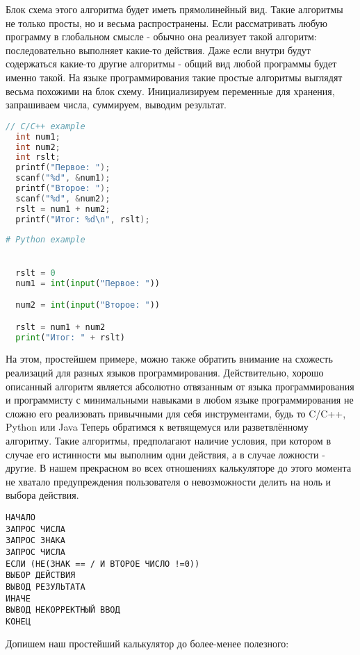 \documentclass[fontsize=14bp]{report}
\begin{document}
Блок схема этого алгоритма будет иметь прямолинейный вид. Такие алгоритмы не только просты, но и весьма распространены. Если рассматривать любую программу в глобальном смысле - обычно она реализует такой алгоритм: последовательно выполняет какие-то действия. Даже если внутри будут содержаться какие-то другие алгоритмы - общий вид любой программы будет именно такой.
На языке программирования такие простые алгоритмы выглядят весьма похожими на блок схему. Инициализируем переменные для хранения, запрашиваем числа, суммируем, выводим результат.
\begin{multicols}{2}
\begin{lstlisting}[language=C,style=CCodeStyle]
  // C/C++ example
  int num1;
  int num2;
  int rslt;
  printf("Первое: ");
  scanf("%d", &num1);
  printf("Второе: ");
  scanf("%d", &num2); 
  rslt = num1 + num2; 
  printf("Итог: %d\n", rslt);
\end{lstlisting}
\columnbreak
\begin{lstlisting}[language=Python,style=PyCodeStyle]
  # Python example


  rslt = 0
  num1 = int(input("Первое: "))

  num2 = int(input("Второе: "))

  rslt = num1 + num2
  print("Итог: " + rslt)

\end{lstlisting}

\end{multicols}
На этом, простейшем примере, можно также обратить внимание на схожесть реализаций для разных языков программирования. Действительно, хорошо описанный алгоритм является абсолютно отвязанным от языка программирования и программисту с минимальными навыками в любом языке программирования не сложно его реализовать привычными для себя инструментами, будь то C/C++, Python или Java
Теперь обратимся к ветвящемуся или разветвлённому алгоритму. Такие алгоритмы, предполагают наличие условия, при котором в случае его истинности мы выполним одни действия, а в случае ложности - другие. В нашем прекрасном во всех отношениях калькуляторе до этого момента не хватало предупреждения пользователя о невозможности делить на ноль и выбора действия.
\begin{verbatim}
НАЧАЛО
ЗАПРОС ЧИСЛА
ЗАПРОС ЗНАКА
ЗАПРОС ЧИСЛА
ЕСЛИ (НЕ(ЗНАК == / И ВТОРОЕ ЧИСЛО !=0))
ВЫБОР ДЕЙСТВИЯ
ВЫВОД РЕЗУЛЬТАТА
ИНАЧЕ
ВЫВОД НЕКОРРЕКТНЫЙ ВВОД
КОНЕЦ
\end{verbatim}
Допишем наш простейший калькулятор до более-менее полезного:
\end{document}
